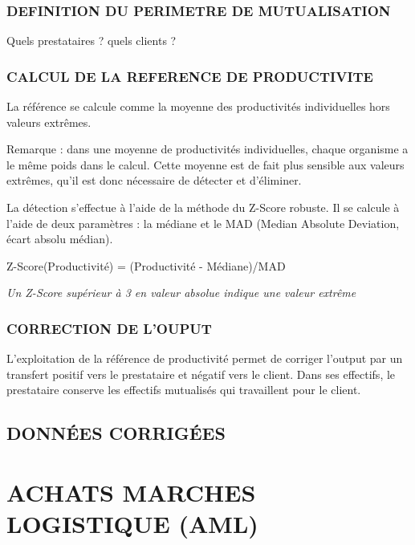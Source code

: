 \documentclass[
]{book}
\begin{document}
\hypertarget{definition-du-perimetre-de-mutualisation-1}{%
\subsection{DEFINITION DU PERIMETRE DE MUTUALISATION}\label{definition-du-perimetre-de-mutualisation-1}}

Quels prestataires ? quels clients ?

\hypertarget{calcul-de-la-reference-de-productivite-1}{%
\subsection{CALCUL DE LA REFERENCE DE PRODUCTIVITE}\label{calcul-de-la-reference-de-productivite-1}}

La référence se calcule comme la moyenne des productivités individuelles hors valeurs extrêmes.

Remarque : dans une moyenne de productivités individuelles, chaque organisme a le même poids dans le calcul. Cette moyenne est de fait plus sensible aux valeurs extrêmes, qu'il est donc nécessaire de détecter et d'éliminer.

La détection s'effectue à l'aide de la méthode du Z-Score robuste.
Il se calcule à l'aide de deux paramètres : la médiane et le MAD (Median Absolute Deviation, écart absolu médian).

Z-Score(Productivité) = (Productivité - Médiane)/MAD

\emph{Un Z-Score supérieur à 3 en valeur absolue indique une valeur extrême}

\hypertarget{correction-de-louput-1}{%
\subsection{CORRECTION DE L'OUPUT}\label{correction-de-louput-1}}

L'exploitation de la référence de productivité permet de corriger l'output par un transfert positif vers le prestataire et négatif vers le client.
Dans ses effectifs, le prestataire conserve les effectifs mutualisés qui travaillent pour le client.

\hypertarget{donnuxe9es-corriguxe9es-1}{%
\section{DONNÉES CORRIGÉES}\label{donnuxe9es-corriguxe9es-1}}

\hypertarget{achats-marches-logistique-aml}{%
\chapter{ACHATS MARCHES LOGISTIQUE (AML)}\label{achats-marches-logistique-aml}}
\end{document}
